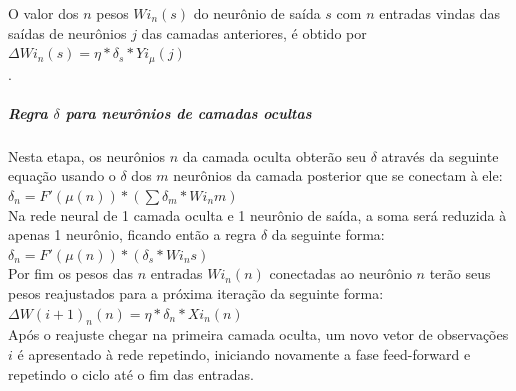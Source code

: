 \documentclass[	12pt, Times, openright, twoside, a4paper, english, brazil]{abntex2}
\begin{document}
            O valor dos $n$ pesos $Wi_{n}(s)$ do neurônio de saída $s$ com $n$ entradas vindas das saídas de neurônios $j$ das camadas anteriores, é obtido por $\Delta Wi_{n}(s) = \eta*\delta_s*Yi_{\mu}(j)$\\.
            \begin{figure}[H]
           \end{figure}
           \subparagraph*{Regra $\delta$ para neurônios de camadas ocultas}
            Nesta etapa, os neurônios $n$ da camada oculta obterão seu $\delta$ através da seguinte equação usando o $\delta$ dos $m$ neurônios da camada posterior que se conectam à ele:\\ 
            
            $\delta_n = F'(\mu(n))*(\sum \delta_m*Wi_{n}m)$\\
            
            Na rede neural de 1 camada oculta e 1 neurônio de saída, a soma será reduzida à apenas 1 neurônio, ficando então a regra $\delta$ da seguinte forma:\\
            
            $\delta_n = F'(\mu(n))*(\delta_s*Wi_{n}s)$\\
            
            Por fim os pesos das $n$ entradas $Wi_{n}(n)$ conectadas ao neurônio $n$ terão seus pesos reajustados para a próxima iteração da seguinte forma:\\
            $\Delta W(i+1)_{n}(n) = \eta*\delta_n*Xi_{n}(n)$\\
            
            Após o reajuste chegar na primeira camada oculta, um novo vetor de observações $i$ é apresentado à rede repetindo, iniciando novamente a fase feed-forward e repetindo o ciclo até o fim das entradas.
            
\end{document}
